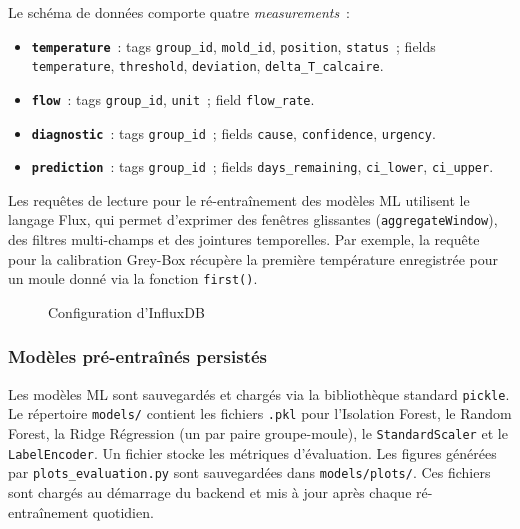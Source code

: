 Le schéma de données comporte quatre \emph{measurements}~:

\begin{itemize}
  \item \textbf{\texttt{temperature}}~: tags \texttt{group\_id}, \texttt{mold\_id}, \texttt{position}, \texttt{status}~; fields \texttt{temperature}, \texttt{threshold}, \texttt{deviation}, \texttt{delta\_T\_calcaire}.
  \item \textbf{\texttt{flow}}~: tags \texttt{group\_id}, \texttt{unit}~; field \texttt{flow\_rate}.
  \item \textbf{\texttt{diagnostic}}~: tags \texttt{group\_id}~; fields \texttt{cause}, \texttt{confidence}, \texttt{urgency}.
  \item \textbf{\texttt{prediction}}~: tags \texttt{group\_id}~; fields \texttt{days\_remaining}, \texttt{ci\_lower}, \texttt{ci\_upper}.
\end{itemize}

Les requêtes de lecture pour le ré-entraînement des modèles ML utilisent le langage Flux, qui permet d'exprimer des fenêtres glissantes (\texttt{aggregateWindow}), des filtres multi-champs et des jointures temporelles. Par exemple, la requête pour la calibration Grey-Box récupère la première température enregistrée pour un moule donné via la fonction \texttt{first()}.

\begin{figure}[htbp]
  \centering
  \caption{Configuration d'InfluxDB}
  \label{fig:influxdb_config}
\end{figure}

\subsubsection{Modèles pré-entraînés persistés}

Les modèles ML sont sauvegardés et chargés via la bibliothèque standard \texttt{pickle}. Le répertoire \texttt{models/} contient les fichiers \texttt{.pkl} pour l'Isolation Forest, le Random Forest, la Ridge Régression (un par paire groupe-moule), le \texttt{StandardScaler} et le \texttt{LabelEncoder}. Un fichier  stocke les métriques d'évaluation. Les figures générées par \texttt{plots\_evaluation.py} sont sauvegardées dans \texttt{models/plots/}. Ces fichiers sont chargés au démarrage du backend et mis à jour après chaque ré-entraînement quotidien.

